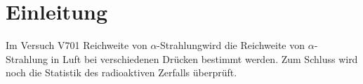 \section{Einleitung}

Im Versuch V701 \textacutedbl Reichweite von $\alpha$-Strahlung\textacutedbl wird die Reichweite von $\alpha$-Strahlung in Luft bei verschiedenen Drücken bestimmt werden. 
Zum Schluss wird noch die Statistik des radioaktiven Zerfalls überprüft.
